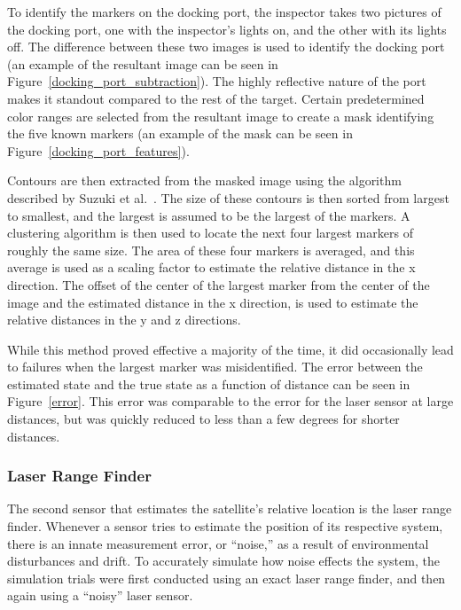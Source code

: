 \documentclass[journal, 10pt]{IEEEtran}
\begin{document}
To identify the markers on the docking port, the inspector takes two pictures of the docking port, one with the inspector's lights on, and the other with its lights off. The difference between these two images is used to identify the docking port (an example of the resultant image can be seen in Figure~\ref{docking_port_subtraction}). The highly reflective nature of the port makes it standout compared to the rest of the target. Certain predetermined color ranges are selected from the resultant image to create a mask identifying the five known markers (an example of the mask can be seen in Figure~\ref{docking_port_features}).

Contours are then extracted from the masked image using the algorithm described by Suzuki et al.~\cite{suzuki1985topological}. The size of these contours is then sorted from largest to smallest, and the largest is assumed to be the largest of the markers. A clustering algorithm is then used to locate the next four largest markers of roughly the same size. The area of these four markers is averaged, and this average is used as a scaling factor to estimate the relative distance in the x direction. The offset of the center of the largest marker from the center of the image and the estimated distance in the x direction, is used to estimate the relative distances in the y and z directions.

While this method proved effective a majority of the time, it did occasionally lead to failures when the largest marker was misidentified. The error between the estimated state and the true state as a function of distance can be seen in Figure~\ref{error}. This error was comparable to the error for the laser sensor at large distances, but was quickly reduced to less than a few degrees for shorter distances.

\subsubsection{Laser Range Finder} \label{laser}
The second sensor that estimates the satellite's relative location is the laser range finder. Whenever a sensor tries to estimate the position of its respective system, there is an innate measurement error, or ``noise,'' as a result of environmental disturbances and drift. To accurately simulate how noise effects the system, the simulation trials were first conducted using an exact laser range finder, and then again using a ``noisy'' laser sensor.
\end{document}

